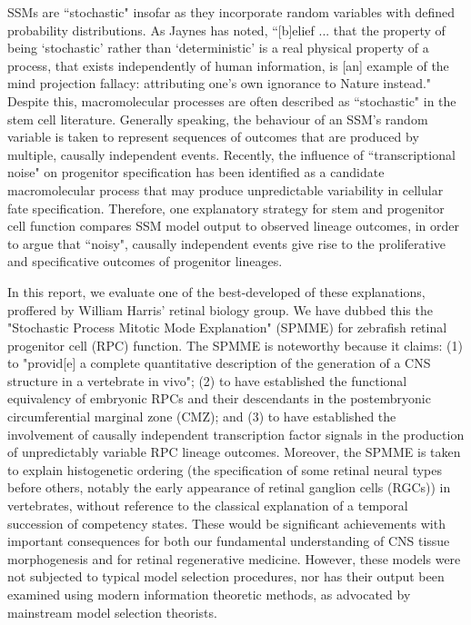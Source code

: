 \documentclass[10pt,letterpaper]{article}
\begin{document}
SSMs are ``stochastic" insofar as they incorporate random variables with defined probability distributions. As Jaynes has noted, ``[b]elief ... that the property of being ‘stochastic' rather than ‘deterministic' is a real physical property of a process, that exists independently of human information, is [an] example of the mind projection fallacy: attributing one’s own ignorance to Nature instead."\cite{Jaynes2003} Despite this, macromolecular processes are often described as ``stochastic" in the stem cell literature. Generally speaking, the behaviour of an SSM's random variable is taken to represent sequences of outcomes that are produced by multiple, causally independent events. Recently, the influence of ``transcriptional noise" on progenitor specification has been identified as a candidate macromolecular process that may produce unpredictable variability in cellular fate specification. Therefore, one explanatory strategy for stem and progenitor cell function compares SSM model output to observed lineage outcomes, in order to argue that ``noisy", causally independent events give rise to the proliferative and specificative outcomes of progenitor lineages.

In this report, we evaluate one of the best-developed of these explanations, proffered by William Harris' retinal biology group. We have dubbed this the "Stochastic Process Mitotic Mode Explanation" (SPMME) for zebrafish retinal progenitor cell (RPC) function. The SPMME is noteworthy because it claims: (1) to "provid[e] a complete quantitative description of the generation of a CNS structure in a vertebrate in vivo"\cite{He2012}; (2) to have established the functional equivalency of embryonic RPCs and their descendants in the postembryonic circumferential marginal zone (CMZ)\cite{Wan2016}; and (3) to have established the involvement of causally independent transcription factor signals in the production of unpredictably variable RPC lineage outcomes\cite{Boije2015}. Moreover, the SPMME is taken to explain histogenetic ordering (the specification of some retinal neural types before others, notably the early appearance of retinal ganglion cells (RGCs)) in vertebrates, without reference to the classical explanation of a temporal succession of competency states\cite{Temple1986}. These would be significant achievements with important consequences for both our fundamental understanding of CNS tissue morphogenesis and for retinal regenerative medicine. However, these models were not subjected to typical model selection procedures, nor has their output been examined using modern information theoretic methods, as advocated by mainstream model selection theorists\cite{Burnham2002}.
\end{document}
